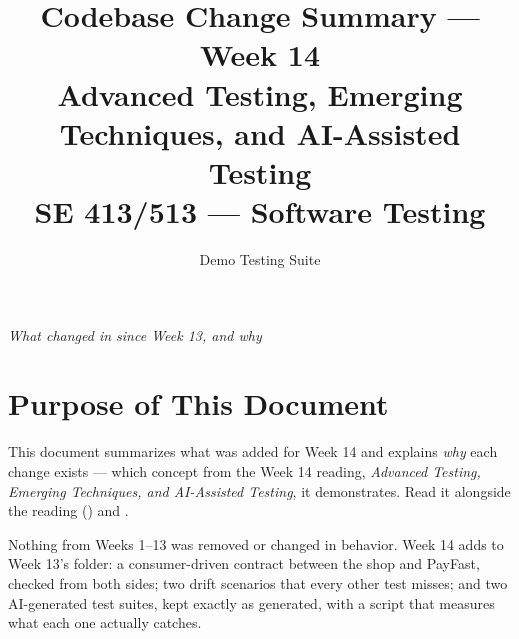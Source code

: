\documentclass[11pt]{article}
\title{
  \textbf{Codebase Change Summary --- Week 14}\\[4pt]
  \large Advanced Testing, Emerging Techniques, and AI-Assisted Testing\\[2pt]
  \normalsize SE 413/513 --- Software Testing
}
\author{Demo Testing Suite}
\date{}
\begin{document}
\maketitle

\begin{center}
\textit{What changed in  since Week 13, and why}
\end{center}

\vspace{0.3cm}

\section{Purpose of This Document}
This document summarizes what was added for Week 14 and explains
\emph{why} each change exists --- which concept from the Week 14
reading, \textit{Advanced Testing, Emerging Techniques, and AI-Assisted
Testing}, it demonstrates. Read it alongside the reading
() and
.

\begin{keyidea}
Nothing from Weeks 1--13 was removed or changed in behavior. Week 14
adds to Week 13's folder: a consumer-driven contract between the shop
and PayFast, checked from both sides; two drift scenarios that every
other test misses; and two AI-generated test suites, kept exactly as
generated, with a script that measures what each one actually catches.
\end{keyidea}

\end{document}

